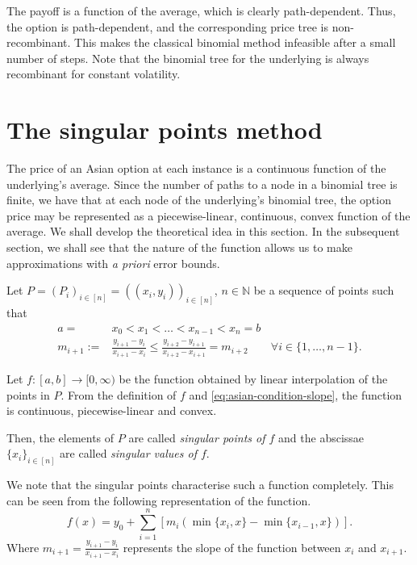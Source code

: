 The payoff is a function of the average, which is clearly path-dependent. Thus, the option is path-dependent, and the corresponding price tree is non-recombinant. This makes the classical binomial method infeasible after a small number of steps. Note that the binomial tree for the underlying is always recombinant for constant volatility.


\section{The singular points method}
\label{sec:asian-method}

The price of an Asian option at each instance is a continuous function of the underlying's average. Since the number of paths to a node in a binomial tree is finite, we have that at each node of the underlying's binomial tree, the option price may be represented as a piecewise-linear, continuous, convex function of the average. We shall develop the theoretical idea in this section. In the subsequent section, we shall see that the nature of the function allows us to make approximations with \emph{a priori} error bounds.


\begin{dfn} \label{def:asian-sp}
	Let $ P = (P_i)_{i \in [n]} = ( (x_i, y_i) )_{i \in [n]} $, $ n \in \mathbb{N} $ be a sequence of points such that
	\begin{subequations}
		\label{eq:asian-conditions}
		\begin{align}
			a =& x_0 < x_1 < \dots < x_{n-1} < x_n = b  \\
			m_{i+1} :=& \frac{y_{i+1} - y_{i}}{x_{i+1} - x_{i}} \le \frac{y_{i+2} - y_{i+1}}{x_{i+2} - x_{i+1}} = m_{i+2} \qquad \forall i \in \{ 1, \dots, n-1 \} .  \label{eq:asian-condition-slope}
		\end{align}
	\end{subequations}
	
	Let $ f:[a,b] \to [0, \infty) $ be the function obtained by linear interpolation of the points in $P$. From the definition of $f$ and \ref{eq:asian-condition-slope}, the function is continuous, piecewise-linear and convex.
	
	Then, the elements of $P$ are called \emph{singular points of $f$} and the abscissae $ \{ x_i \}_{i \in [n]} $ are called \emph{singular values of $f$}.
\end{dfn}


\begin{rem}
	\label{rem:asian-char}
	We note that the singular points characterise such a function completely. This can be seen from the following representation of the function.
	\begin{equation}
		\label{eq:asian-function-repr}
		f(x) = y_0 + \sum_{i=1}^n [ m_i ( \min \{x_{i}, x \} - \min \{ x_{i-1}, x \} ) ] .
	\end{equation}
	Where $ m_{i+1} = \frac{y_{i+1} - y_{i}}{x_{i+1} - x_{i}} $ represents the slope of the function between $ x_{i} $ and $ x_{i+1} $.
\end{rem}


